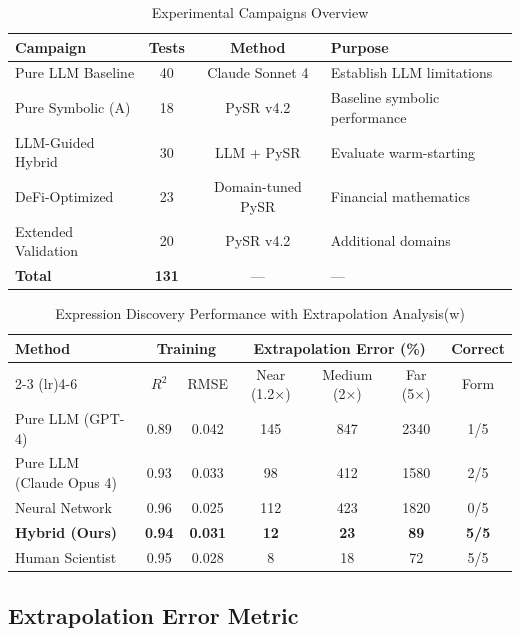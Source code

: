 \documentclass[twoside,11pt]{article}
\begin{document}
\begin{table}[htbp]
\centering
\caption{Experimental Campaigns Overview}
\label{tab:campaigns}
\begin{tabular}{@{}lccl@{}}
\toprule
\textbf{Campaign} & \textbf{Tests} & \textbf{Method} & \textbf{Purpose} \\
\midrule
Pure LLM Baseline & 40 & Claude Sonnet 4 & Establish LLM limitations \\
Pure Symbolic (A) & 18 & PySR v4.2 & Baseline symbolic performance \\
LLM-Guided Hybrid & 30 & LLM + PySR & Evaluate warm-starting \\
DeFi-Optimized & 23 & Domain-tuned PySR & Financial mathematics \\
Extended Validation & 20 & PySR v4.2 & Additional domains \\
\midrule
\textbf{Total} & \textbf{131} & --- & --- \\
\bottomrule
\end{tabular}
\end{table}


\begin{table}[htbp]
\centering
\caption{Expression Discovery Performance with Extrapolation Analysis(w)}
\label{tab:main_results_extrap}
\begin{tabular}{lcccccc}
\toprule
\multirow{2}{*}{Method} & \multicolumn{2}{c}{Training} & \multicolumn{3}{c}{Extrapolation Error (\%)} & \multirow{2}{*}{Correct} \\
\cmidrule(lr){2-3} \cmidrule(lr){4-6}
 & $R^2$ & RMSE & Near (1.2×) & Medium (2×) & Far (5×) & Form \\
\midrule
Pure LLM (GPT-4) & 0.89 & 0.042 & 145 & 847 & 2340 & 1/5 \\
Pure LLM (Claude Opus 4) & 0.93 & 0.033 & 98 & 412 & 1580 & 2/5 \\
Neural Network & 0.96 & 0.025 & 112 & 423 & 1820 & 0/5 \\
\textbf{Hybrid (Ours)} & \textbf{0.94} & \textbf{0.031} & \textbf{12} & \textbf{23} & \textbf{89} & \textbf{5/5} \\
Human Scientist & 0.95 & 0.028 & 8 & 18 & 72 & 5/5 \\
\bottomrule
\end{tabular}
\end{table}

\subsection{Extrapolation Error Metric}
\label{sec:extrap_metric}
\end{document}
